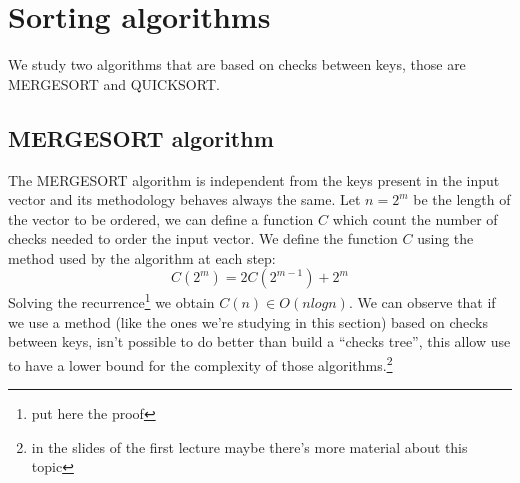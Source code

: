 \section{Sorting algorithms}

We study two algorithms that are based on checks between keys, those
are MERGESORT and QUICKSORT.

\subsection{MERGESORT algorithm}

The MERGESORT algorithm is independent from the keys present in the
input vector and its methodology behaves always the same. Let $n =
2^m$ be the length of the vector to be ordered, we can define a
function $C$ which count the number of checks needed to order the
input vector. We define the function $C$ using the method used by the
algorithm at each step:
\begin{displaymath}
  C(2^m) = 2C(2^{m-1}) + 2^m
\end{displaymath}
Solving the recurrence\footnote{put here the proof} we obtain $C(n)
\in O(n logn)$. We can observe that if we use a method (like the ones
we're studying in this section) based on checks between keys, isn't
possible to do better than build a ``checks tree'', this allow use to
have a lower bound for the complexity of those algorithms.\footnote{in
  the slides of the first lecture maybe there's more material about
  this topic}

